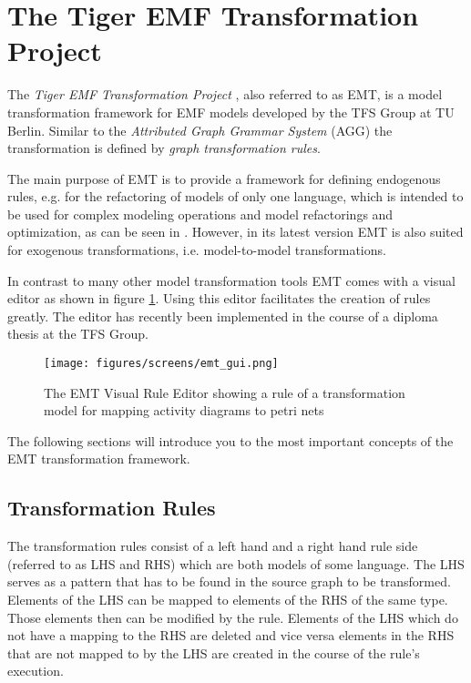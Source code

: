 \section{The Tiger EMF Transformation Project}
\label{sec:emt}

The \emph{Tiger EMF Transformation Project} \cite{EMT}, also referred to as EMT, is a model transformation framework for EMF models developed by the TFS Group at TU Berlin. Similar to the \emph{Attributed Graph Grammar System} (AGG) \cite{AGG} the transformation is defined by \emph{graph transformation rules}.

The main purpose of EMT is to provide a framework for defining endogenous rules, e.g. for the refactoring of models of only one language, which is intended to be used for complex modeling operations and model refactorings and optimization, as can be seen in \cite{emt_paper}. However, in its latest version EMT is also suited for exogenous transformations, i.e. model-to-model transformations.

In contrast to many other model transformation tools EMT comes with a visual editor as shown in figure \ref{fig:emt_gui}. Using this editor facilitates the creation of rules greatly. The editor has recently been implemented in the course of a diploma thesis \cite{emt_thesis} at the TFS Group.

\begin{figure}[htp]
	\centering
	\texttt{[image: figures/screens/emt\_gui.png]}
	\caption[EMT Visual Rule Editor]{The EMT Visual Rule Editor showing a rule of a transformation model for mapping activity diagrams to petri nets}
	\label{fig:emt_gui}
\end{figure}

The following sections will introduce you to the most important concepts of the EMT transformation framework.


\subsection{Transformation Rules}

The transformation rules consist of a left hand and a right hand rule side (referred to as LHS and RHS) which are both models of some language. The LHS serves as a pattern that has to be found in the source graph to be transformed. Elements of the LHS can be mapped to elements of the RHS of the same type. Those elements then can be modified by the rule. Elements of the LHS which do not have a mapping to the RHS are deleted and vice versa elements in the RHS that are not mapped to by the LHS are created in the course of the rule's execution.

